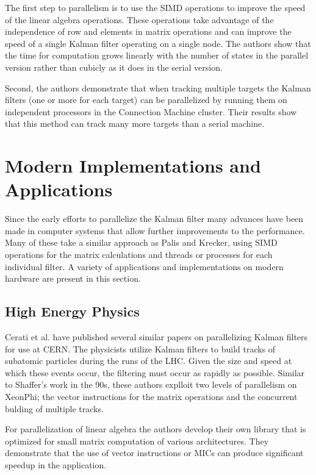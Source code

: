 \documentclass[11pt]{article}
\begin{document}
The first step to parallelism is to use the SIMD operations to improve the speed of the linear algebra operations. These operations take advantage of the independence of row and elements in matrix operations and can improve the speed of a single Kalman filter operating on a single node. The authors show that the time for computation grows linearly with the number of states in the parallel version rather than cubicly as it does in the serial version. 

Second, the authors demonstrate that when tracking multiple targets the Kalman filters (one or more for each target) can be parallelized by running them on independent processors in the Connection Machine cluster. Their results show that this method can track many more targets than a serial machine.

\section{Modern Implementations and Applications}
Since the early efforts to parallelize the Kalman filter many advances have been made in computer systems that allow further improvements to the performance. Many of these take a similar approach as Palis and Krecker, using SIMD operations for the matrix calculations and threads or processes for each individual filter. A variety of applications and implementations on modern hardware are present in this section.


\subsection{High Energy Physics}
Cerati et al. have published several similar papers \cite{cerati2015kalman,cerati2016kalman,cerati2015traditional} on parallelizing Kalman filters for use at CERN. The physicists utilize Kalman filters to build tracks of subatomic particles during the runs of the LHC. Given the size and speed at which these events occur, the filtering must occur as rapidly as possible. Similar to Shaffer's work in the 90s, these authors explloit two levels of parallelism on XeonPhi; the vector instructions for the matrix operations and the concurrent bulding of multiple tracks.

For parallelization of linear algebra the authors develop their own library that is optimized for small matrix computation of various architectures. They demonstrate that the use of vector instructions or MICs can produce significant speedup in the application.
\end{document}

